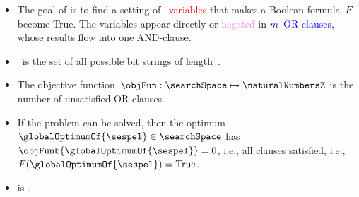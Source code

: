 %
\begin{frame}%
%
\parbox{0.42\paperwidth}{%
\begin{itemize}%
%
\item The goal of  is to find a setting of \textcolor<2>{red}{\scale~variables} that makes a Boolean formula~$F$ become True. %
The variables appear directly or \textcolor<3>{violet}{negated} in \textcolor<4>{blue}{$m$~OR\nobreakdashes-clauses}, whose results flow into \textcolor<5>{green!40!black}{one AND\nobreakdashes-clause}.%
%
\item<6-> \searchSpace\ is the set of all possible bit strings of length~\scale.%
%
\item<7-> The objective function~$\objFun:\searchSpace\mapsto\naturalNumbersZ$ is the number of unsatisfied OR\nobreakdashes-clauses.%
%
\item<8-> If the problem can be solved, then the optimum~$\globalOptimumOf{\sespel}\in\searchSpace$ has $\objFunb{\globalOptimumOf{\sespel}}=0$, i.e., all clauses satisfied, i.e., $F(\globalOptimumOf{\sespel})=\textnormal{True}$.%
%
\item<9->  is \npComplete\cite{C1971TCOTPP}.%
%
\end{itemize}%
}%
%
%
%
%
%
%
%
\end{frame}%
%
\global\let\sharedSlideTitle\relax%
%
